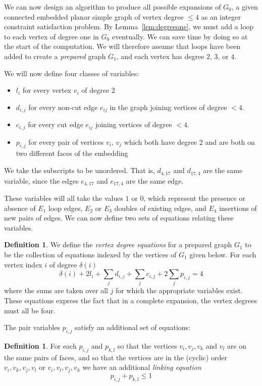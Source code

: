 \documentclass[amsmath,secnumarabic,floatfix,amssymb,nofootinbib,nobibnotes,letterpaper,11pt,tightenlines,showkeys]{revtex4}
\theoremstyle{definition}
\newtheorem{definition}[theorem]{Definition}
\newcommand{\loopinsert}{E_1}
\newcommand{\edgedouble}{E_2}
\newcommand{\cutedgedouble}{E_3}
\newcommand{\pairinsert}{E_4}
\begin{document}
We can now design an algorithm to produce all possible expansions of $G_0$, a given connected embedded planar simple graph of vertex degree $\leq 4$ as an integer constraint satisfaction problem. By Lemma~\ref{lem:degreeone}, we must add a loop to each vertex of degree one in $G_0$ eventually. We can save time by doing so at the start of the computation. We will therefore assume that loops have been added to create a \emph{prepared} graph $G_1$, and each vertex has degree $2$, $3$, or $4$.

We will now define four classes of variables:
\begin{itemize}
\item $l_{i}$ for every vertex $v_i$ of degree $2$
\item $d_{i,j}$ for every non-cut edge $e_{ij}$ in the graph joining vertices of degree $<4$.
\item $c_{i,j}$ for every cut edge $e_{ij}$ joining vertices of degree $<4$.
\item $p_{i,j}$ for every pair of vertices $v_{i}$, $v_j$ which both have degree 2 and are both on two different faces of the embedding
\end{itemize}
We take the subscripts to be unordered. That is, $d_{4,17}$ and $d_{17,4}$ are the same variable, since the edges $e_{4,17}$ and $e_{17,4}$ are the same edge.

These variables will all take the values $1$ or $0$, which represent the presence or absence of $\loopinsert$ loop edges, $\edgedouble$ or $\cutedgedouble$ doubles of existing edges, and $\pairinsert$ insertions of new pairs of edges.
We can now define two sets of equations relating these variables.

\begin{definition}
We define the \emph{vertex degree equations} for a prepared graph $G_1$ to be the collection of equations indexed by the vertices of $G_1$ given below. For each vertex index $i$ of degree $\delta(i)$
\begin{equation*}
\delta(i) + 2 l_i + \sum_j d_{i,j} + \sum_j c_{i,j} + 2 \sum_j p_{i,j} = 4
\end{equation*}
where the sums are taken over all $j$ for which the appropriate variables exist. These equations express the fact that in a complete expansion, the vertex degrees must all be four.
\end{definition}

The pair variables $p_{i,j}$ satisfy an additional set of equations:
\begin{definition}
For each $p_{i,j}$ and $p_{k,l}$ so that the vertices $v_i, v_j, v_k$ and $v_l$ are on the same pairs of faces, and so that the vertices are in the (cyclic) order $v_i, v_k, v_j, v_l$ or $v_i, v_l, v_j, v_k$ we have an additional \emph{linking equation}
\begin{equation*}
p_{i,j} + p_{k,l} \leq 1
\end{equation*}
\end{definition}
\end{document}
